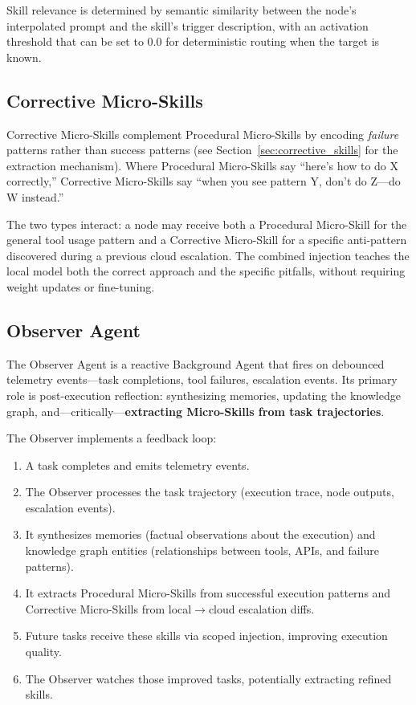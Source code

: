 \documentclass{article}
\begin{document}
Skill relevance is determined by semantic similarity between the node's interpolated prompt and the skill's trigger description, with an activation threshold that can be set to 0.0 for deterministic routing when the target is known.

\subsection{Corrective Micro-Skills}
\label{sec:corrective_skills_detail}

Corrective Micro-Skills complement Procedural Micro-Skills by encoding \emph{failure} patterns rather than success patterns (see Section~\ref{sec:corrective_skills} for the extraction mechanism).
Where Procedural Micro-Skills say ``here's how to do X correctly,'' Corrective Micro-Skills say ``when you see pattern Y, don't do Z---do W instead.''

The two types interact: a node may receive both a Procedural Micro-Skill for the general tool usage pattern and a Corrective Micro-Skill for a specific anti-pattern discovered during a previous cloud escalation.
The combined injection teaches the local model both the correct approach and the specific pitfalls, without requiring weight updates or fine-tuning.

\subsection{Observer Agent}
\label{sec:observer_agent}

The Observer Agent is a reactive Background Agent that fires on debounced telemetry events---task completions, tool failures, escalation events.
Its primary role is post-execution reflection: synthesizing memories, updating the knowledge graph, and---critically---\textbf{extracting Micro-Skills from task trajectories}.

The Observer implements a feedback loop:
\begin{enumerate}[leftmargin=*]
\item A task completes and emits telemetry events.
\item The Observer processes the task trajectory (execution trace, node outputs, escalation events).
\item It synthesizes memories (factual observations about the execution) and knowledge graph entities (relationships between tools, APIs, and failure patterns).
\item It extracts Procedural Micro-Skills from successful execution patterns and Corrective Micro-Skills from local$\to$cloud escalation diffs.
\item Future tasks receive these skills via scoped injection, improving execution quality.
\item The Observer watches those improved tasks, potentially extracting refined skills.
\end{enumerate}
\end{document}
